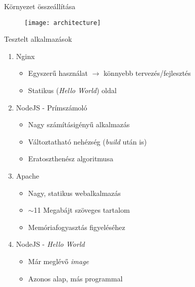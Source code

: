\documentclass{beamer}
\begin{document}

\begin{frame}[t]{Környezet összeállítása}
\begin{figure}
	\centering
	\texttt{[image: architecture]}
\end{figure}
\end{frame}


\begin{frame}[t]{Tesztelt alkalmazások}
\begin{enumerate}
\item Nginx
	\begin{itemize}
	\item Egyszerű használat $\rightarrow$ könnyebb tervezés/fejlesztés
	\item Statikus (\textit{Hello World}) oldal
	\end{itemize}
\item NodeJS - Prímszámoló
	\begin{itemize}
	\item Nagy számításigényű alkalmazás
	\item Változtatható nehézség (\textit{build} után is)
	\item Eratoszthenész algoritmusa
	\end{itemize}
\item Apache
	\begin{itemize}
	\item Nagy, statikus webalkalmazás
	\item $\sim$11 Megabájt szöveges tartalom
	\item Memóriafogyasztás figyeléséhez
	\end{itemize}
\item NodeJS - \textit{Hello World}
	\begin{itemize}
	\item Már meglévő \textit{image}
	\item Azonos alap, más programmal
	\end{itemize}
\end{enumerate}
\end{frame}
\end{document}

